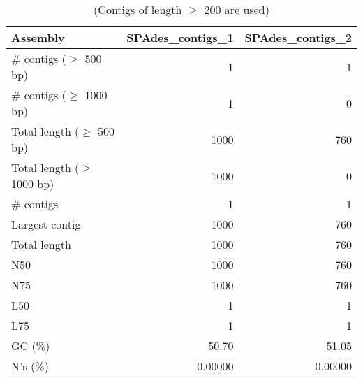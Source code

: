 \begin{table}[ht]
\begin{center}
\caption{(Contigs of length $\geq$ 200 are used)}
\begin{tabular}{|l*{2}{|r}|}
\hline
Assembly & SPAdes\_contigs\_1 & SPAdes\_contigs\_2 \\ \hline
\# contigs ($\geq$ 500 bp) & 1 & 1 \\ \hline
\# contigs ($\geq$ 1000 bp) & 1 & 0 \\ \hline
Total length ($\geq$ 500 bp) & 1000 & 760 \\ \hline
Total length ($\geq$ 1000 bp) & 1000 & 0 \\ \hline
\# contigs & 1 & 1 \\ \hline
Largest contig & 1000 & 760 \\ \hline
Total length & 1000 & 760 \\ \hline
N50 & 1000 & 760 \\ \hline
N75 & 1000 & 760 \\ \hline
L50 & 1 & 1 \\ \hline
L75 & 1 & 1 \\ \hline
GC (\%) & 50.70 & 51.05 \\ \hline
N's (\%) & 0.00000 & 0.00000 \\ \hline
\end{tabular}
\end{center}
\end{table}
